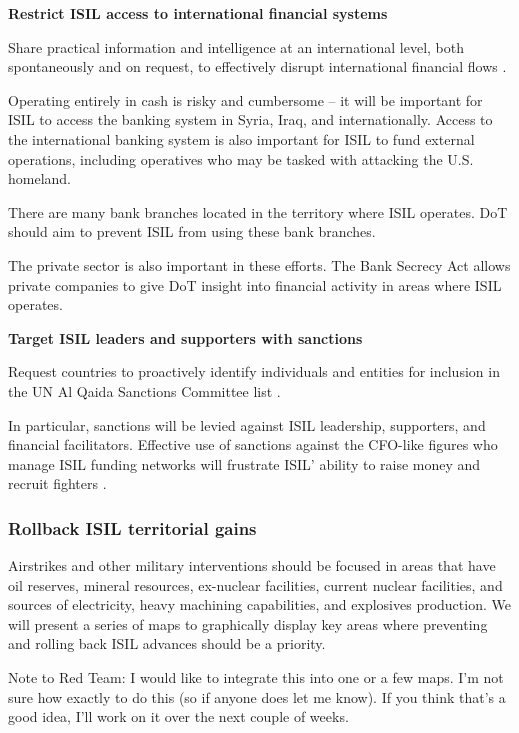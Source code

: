 \documentclass{report}
\begin{document}
\textbf{Restrict ISIL access to international financial systems}

Share practical information and intelligence at an international level, both spontaneously and on request, to effectively disrupt international financial flows \cite{Report2015}.

Operating entirely in cash is risky and cumbersome – it will be important for ISIL to access the banking system in Syria, Iraq, and internationally. Access to the international banking system is also important for ISIL to fund external operations, including operatives who may be tasked with attacking the U.S. homeland. 

There are many bank branches located in the territory where ISIL operates. DoT should aim to prevent ISIL from using these bank branches. 

The private sector is also important in these efforts. The Bank Secrecy Act allows private companies to give DoT insight into financial activity in areas where ISIL operates. 

\textbf{Target ISIL leaders and supporters with sanctions}

Request countries to proactively identify individuals and entities for inclusion in the UN Al Qaida Sanctions Committee list \cite{Report2015}.

In particular, sanctions will be levied against ISIL leadership, supporters, and financial facilitators. Effective use of sanctions against the CFO-like figures who manage ISIL funding networks will frustrate ISIL’ ability to raise money and recruit fighters \cite{Cohen2014}.

\subsubsection{Rollback ISIL territorial gains}

Airstrikes and other military interventions should be focused in areas that have oil reserves, mineral resources, ex-nuclear facilities, current nuclear facilities, and sources of electricity, heavy machining capabilities, and explosives production. We will present a series of maps to graphically display key areas where preventing and rolling back ISIL advances should be a priority.

Note to Red Team: I would like to integrate this into one or a few maps. I’m not sure how exactly to do this (so if anyone does let me know). If you think that’s a good idea, I’ll work on it over the next couple of weeks.
\end{document}
